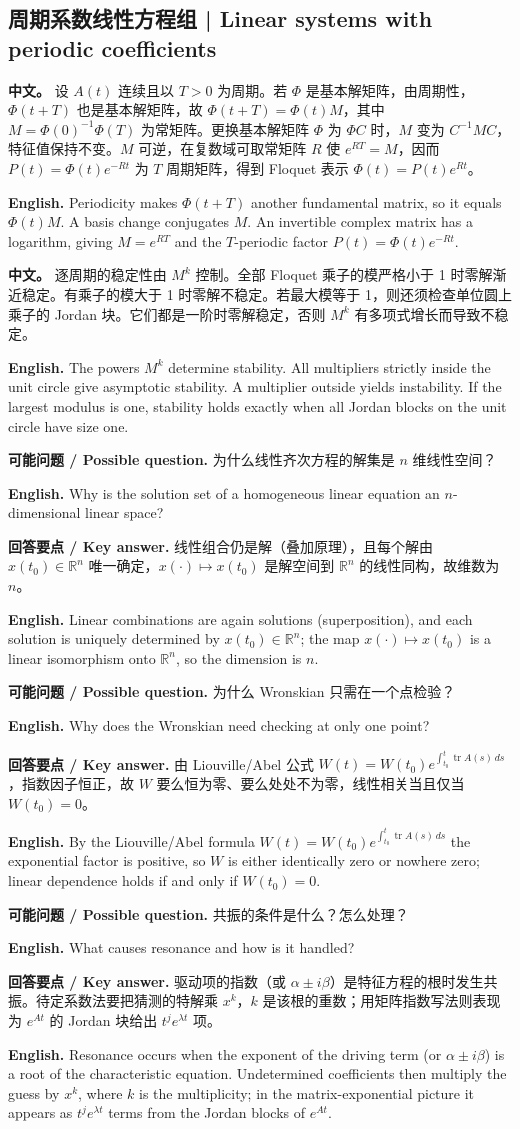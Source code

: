 \documentclass[UTF8,11pt,a4paper]{ctexart}
\newcommand{\APS}[2]{\par\noindent\textbf{中文。} #1\par\noindent\textbf{English.} #2\par}
\newcommand{\EN}[1]{\par\noindent \textbf{English.} #1\par}
\newcommand{\ASK}[4]{\par\noindent \textbf{可能问题 / Possible question.} #1\par\EN{#2}\noindent \textbf{回答要点 / Key answer.} #3\par\EN{#4}\medskip}
\begin{document}
\subsection{周期系数线性方程组 | Linear systems with periodic coefficients}
\APS{设 $A(t)$ 连续且以 $T>0$ 为周期。若 $\Phi$ 是基本解矩阵，由周期性，$\Phi(t+T)$ 也是基本解矩阵，故 $\Phi(t+T)=\Phi(t)M$，其中 $M=\Phi(0)^{-1}\Phi(T)$ 为常矩阵。更换基本解矩阵 $\Phi$ 为 $\Phi C$ 时，$M$ 变为 $C^{-1}MC$，特征值保持不变。$M$ 可逆，在复数域可取常矩阵 $R$ 使 $e^{RT}=M$，因而 $P(t)=\Phi(t)e^{-Rt}$ 为 $T$ 周期矩阵，得到 Floquet 表示 $\Phi(t)=P(t)e^{Rt}$。}{Periodicity makes $\Phi(t+T)$ another fundamental matrix, so it equals $\Phi(t)M$. A basis change conjugates $M$. An invertible complex matrix has a logarithm, giving $M=e^{RT}$ and the $T$-periodic factor $P(t)=\Phi(t)e^{-Rt}$.}
\APS{逐周期的稳定性由 $M^k$ 控制。全部 Floquet 乘子的模严格小于 1 时零解渐近稳定。有乘子的模大于 1 时零解不稳定。若最大模等于 1，则还须检查单位圆上乘子的 Jordan 块。它们都是一阶时零解稳定，否则 $M^k$ 有多项式增长而导致不稳定。}{The powers $M^k$ determine stability. All multipliers strictly inside the unit circle give asymptotic stability. A multiplier outside yields instability. If the largest modulus is one, stability holds exactly when all Jordan blocks on the unit circle have size one.}
\ASK{为什么线性齐次方程的解集是 $n$ 维线性空间？}{Why is the solution set of a homogeneous linear equation an $n$-dimensional linear space?}{线性组合仍是解（叠加原理），且每个解由 $x(t_0)\in\mathbb R^n$ 唯一确定，$x(\cdot)\mapsto x(t_0)$ 是解空间到 $\mathbb R^n$ 的线性同构，故维数为 $n$。}{Linear combinations are again solutions (superposition), and each solution is uniquely determined by $x(t_0)\in\mathbb R^n$; the map $x(\cdot)\mapsto x(t_0)$ is a linear isomorphism onto $\mathbb R^n$, so the dimension is $n$.}
\ASK{为什么 Wronskian 只需在一个点检验？}{Why does the Wronskian need checking at only one point?}{由 Liouville/Abel 公式 $W(t)=W(t_0)e^{\int_{t_0}^t\operatorname{tr}A(s)\,ds}$，指数因子恒正，故 $W$ 要么恒为零、要么处处不为零，线性相关当且仅当 $W(t_0)=0$。}{By the Liouville/Abel formula $W(t)=W(t_0)e^{\int_{t_0}^t\operatorname{tr}A(s)\,ds}$ the exponential factor is positive, so $W$ is either identically zero or nowhere zero; linear dependence holds if and only if $W(t_0)=0$.}
\ASK{共振的条件是什么？怎么处理？}{What causes resonance and how is it handled?}{驱动项的指数（或 $\alpha\pm i\beta$）是特征方程的根时发生共振。待定系数法要把猜测的特解乘 $x^k$，$k$ 是该根的重数；用矩阵指数写法则表现为 $e^{At}$ 的 Jordan 块给出 $t^je^{\lambda t}$ 项。}{Resonance occurs when the exponent of the driving term (or $\alpha\pm i\beta$) is a root of the characteristic equation. Undetermined coefficients then multiply the guess by $x^k$, where $k$ is the multiplicity; in the matrix-exponential picture it appears as $t^je^{\lambda t}$ terms from the Jordan blocks of $e^{At}$.}
\end{document}
